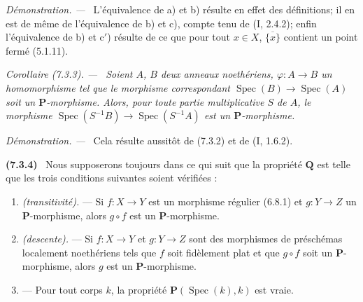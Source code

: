 \documentclass[10pt,oneside]{book}
\newenvironment{env}[1][]{\par\medskip\noindent\textbf{(#1)}\ }{\par}
\newenvironment{corollary}[1][]{%
  \par\medskip\noindent\itshape Corollaire (#1). ---\ }{\par}
\newenvironment{proof}{%
  \par\medskip\noindent\textit{Démonstration. ---\ }}{\par}
\begin{document}
\begin{proof}
L'équivalence de a) et b) résulte en effet des définitions; il en est de
même de l'équivalence de b) et c), compte tenu de (I, 2.4.2); enfin
l'équivalence de b) et c$'$) résulte de ce que pour tout $x\in X$,
$\overline{\{x\}}$ contient un point fermé (5.1.11).
\end{proof}

\begin{corollary}[7.3.3]
\label{IV.2.s7.3.3-fr}
Soient $A$, $B$ deux anneaux noethériens, $\varphi:A\to B$ un homomorphisme
tel que le morphisme correspondant
$\operatorname{Spec}(B)\to\operatorname{Spec}(A)$ soit un
$\boldsymbol P$-morphisme. Alors, pour toute partie multiplicative $S$ de
$A$, le morphisme
$\operatorname{Spec}(S^{-1}B)\to\operatorname{Spec}(S^{-1}A)$ est un
$\boldsymbol P$-morphisme.
\end{corollary}

\begin{proof}
Cela résulte aussitôt de (7.3.2) et de (I, 1.6.2).
\end{proof}

\begin{env}[7.3.4]
\label{IV.2.s7.3.4-fr}
Nous supposerons toujours dans ce qui suit que la propriété
$\boldsymbol Q$ est telle que les trois conditions suivantes soient
vérifiées :
\begin{enumerate}
\item[$(\mathrm P_{\mathrm I})$] \emph{(transitivité).} --- Si
$f:X\to Y$ est un morphisme régulier (6.8.1) et $g:Y\to Z$ un
$\boldsymbol P$-morphisme, alors $g\circ f$ est un
$\boldsymbol P$-morphisme.
\item[$(\mathrm P_{\mathrm{II}})$] \emph{(descente).} --- Si
$f:X\to Y$ et $g:Y\to Z$ sont des morphismes de préschémas localement
noethériens tels que $f$ soit fidèlement plat et que $g\circ f$ soit un
$\boldsymbol P$-morphisme, alors $g$ est un $\boldsymbol P$-morphisme.
\item[$(\mathrm P_{\mathrm{III}})$] --- Pour tout corps $k$, la propriété
$\boldsymbol P(\operatorname{Spec}(k),k)$ est vraie.
\end{enumerate}
\end{env}
\end{document}
